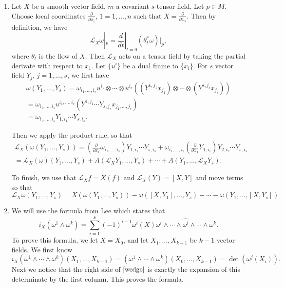 \documentclass[11pt, reqno]{article}
\theoremstyle{plain}
\theoremstyle{definition}
\theoremstyle{remark}
\begin{document}
\begin{enumerate}
    \item[2.] Let $X$ be a smooth vector field, $m$ a covariant $s$-tensor field. Let $p \in M$. 
    Choose local coordinates $\frac{\partial}{\partial x_i}$, $1 = 1, \dots, n$ such 
    that $X = \frac{\partial}{\partial x_1}$. Then by definition, we have
    \[
        \mathcal{L}_X \omega|_p = \frac{d}{dt}|_{t = 0}(\theta_t^* \omega)|_p,
    \]
    where $\theta_t$ is the flow of $X$. Then $\mathcal{L}_X$ acts on a tensor
    field by taking the partial derivate with respect to $x_1$. 
    Let $\{u^i\}$ be a dual frame to $\{x_i\}$. For $s$ vector
    field $Y_j$, $j = 1, \dots, s$, we first have
    \begin{align*}
        \omega(Y_1, \dots, Y_s) = \omega_{i_1, \dots, i_s}u^{i_1}\otimes \cdots\otimes u^{i_s}
        \left(\left(Y^{1, j_1}x_{j_1}\right)\otimes \cdots\otimes \left(Y^{s, j_s}x_{j_s}\right)\right)\\
        = \omega_{i_1, \dots, i_s}u^{i_1, \dots, i_s}\left(Y^{1, j_1} \cdots Y_{s, j_s} x_{j_1, \dots, j_s}\right)\\
        = \omega_{i_1, \dots, i_s}Y_{1, i_1}\cdots Y_{s, i_s}.
    \end{align*}

    Then we apply the product rule, so that 
    \begin{align*}
        \mathcal{L}_X(\omega(Y_1, \dots, Y_s)) = \left(\frac{\partial}{\partial x_1}\omega_{i_1, \dots, i_s}\right)Y_{1, i_1}\cdots Y_{s, i_s}
        + \omega_{i_1, \dots, i_s}\left(\frac{\partial}{\partial x_1} Y_{1, i_1}\right) Y_{2, i_2}\cdots Y_{s , i_s}\\
        = \mathcal{L}_X(\omega)(Y_1, \dots, Y_s) + A(\mathcal{L}_X Y_1, \dots, Y_s) + \cdots + A(Y_1, \dots, \mathcal{L}_X Y_s).
    \end{align*}

    To finish, we use that $\mathcal{L}_X f = X(f)$ and $\mathcal{L}_X(Y) = [X,Y]$ and move terms so that
    \[
        \mathcal{L}_X\omega(Y_1, \dots, Y_s) = X(\omega(Y_1, \dots, Y_s)) - 
    \omega([X, Y_1], \dots, Y_s) - \cdots - \omega(Y_1, \dots, [X, Y_s])
    \]

    \item[3.] We will use the formula from Lee which states that 
    \begin{equation}\label{wedge}
        i_X(\omega^1 \wedge \omega^k) = \sum_{i = 1}^k (-1)^{i-1}\omega^i(X)\omega^i\wedge 
        \cdots \wedge \hat{\omega^i} \wedge \cdots \wedge \omega^k.
    \end{equation}
    To prove this formula, we let $X = X_0$, and let $X_1, \dots, X_{k - 1}$ be $k-1$ vector fields.
    We first know 
    \[
        i_X(\omega^1 \wedge \cdots \wedge \omega^k)(X_1,\dots, X_{k-1})
        = (\omega^1\wedge \cdots\wedge \omega^k)(X_0, \dots, X_{k-1}) = \det(\omega^j(X_{i})).
    \]
    Next we notice that the right side of $\ref{wedge}$ is exactly the expansion of this determinate 
    by the first column. This proves the formula.


\end{enumerate}
\end{document}
